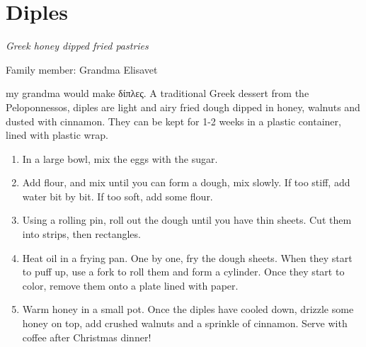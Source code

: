 \chapter{Diples}
\label{ch:diples}



\textit{Greek honey dipped fried pastries}

Family member: Grandma Elisavet

 my grandma would make \textgreek{δίπλες}. A traditional Greek dessert from the Peloponnessos, diples are light and airy fried dough dipped in honey, walnuts and dusted with cinnamon. They can be kept for 1-2 weeks in a plastic container, lined with plastic wrap.

\begin{enumerate}
    \item In a large bowl, mix the eggs with the sugar.
    \item Add flour, and mix until you can form a dough, mix slowly. If too stiff, add water bit by bit. If too soft, add some flour.
    \item Using a rolling pin, roll out the dough until you have thin sheets. Cut them into strips, then rectangles.
    \item Heat oil in a frying pan. One by one, fry the dough sheets. When they start to puff up, use a fork to roll them and form a cylinder. Once they start to color, remove them onto a plate lined with paper.
    \item Warm honey in a small pot. Once the diples have cooled down, drizzle some honey on top, add crushed walnuts and a sprinkle of cinnamon. Serve with coffee after Christmas dinner!
\end{enumerate}
